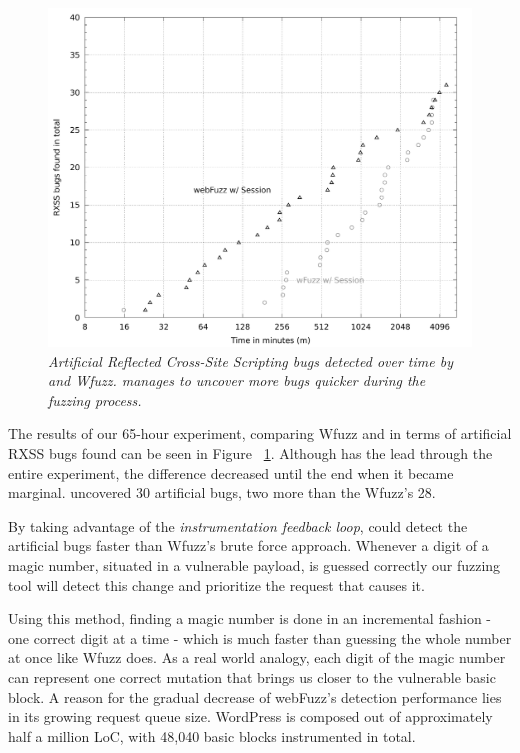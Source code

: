 \begin{figure}[!htb]
  \centering \includegraphics[width=\linewidth]{figures/plot_bugs.pdf}
  \captionsetup{justification=centering}
  \caption[Number of artificial XSS bugs uncovered by \pname{} and Wfuzz]{\textit{Artificial Reflected Cross-Site Scripting bugs detected over time by \pname{} and Wfuzz. \pname{} manages to uncover more bugs quicker during the fuzzing process.}} 
  \label{fig:plot_rxss}
\end{figure}

The results of our 65-hour experiment, comparing Wfuzz and \pname{} in terms of artificial RXSS bugs found can be seen in Figure ~\ref{fig:plot_rxss}. Although \pname{} has the lead through the entire experiment, the difference decreased until the end when it became marginal. \pname{} uncovered 30 artificial bugs, two more than the Wfuzz's 28.

By taking advantage of the \emph{instrumentation feedback loop}, \pname{} could detect the artificial bugs faster than Wfuzz's brute force approach. Whenever a digit of a magic
number, situated in a vulnerable payload, is guessed correctly our fuzzing tool will detect this change and prioritize the request that causes it. 

Using this method, finding a magic number is done in an incremental fashion - one correct digit at a time - which is much faster than guessing the whole number at once like Wfuzz does. As a real world analogy, each digit of the magic number can represent one correct mutation that brings us closer to the vulnerable basic block. A reason for the gradual decrease of webFuzz's detection performance lies in its growing request queue size. WordPress is composed out of approximately half a million LoC, with 48,040 basic blocks instrumented in total.

